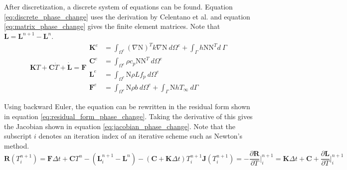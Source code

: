 After discretization, a discrete system of equations can be found. Equation \ref{eq:discrete_phase_change} uses the derivation by Celentano et al. \cite{Celentano_Oñate_Oller_1994} and equation \ref{eq:matrix_phase_change} gives the finite element matrices. Note that $\dot{\mathbf{L}} = \mathbf{L}^{n+1}-\mathbf{L}^n$.
\begin{subequations}
    \begin{equation}
        \mathbf{K}T + \mathbf{C}\dot{T} + \dot{\mathbf{L}} = \mathbf{F}
        \label{eq:discrete_phase_change}
    \end{equation}
    \begin{equation}
        \begin{split}
            \mathbf{K}^e&=\int_{\Omega^e}(\nabla \text{N})^T  k  \nabla \text{N} \ d\Omega^e + \int_{\Gamma}h\text{N}\text{N}^Td \ \Gamma \\
            \mathbf{C}^e&=\int_{\Omega^e}\rho c_p \text{N}\text{N}^T \ d\Omega^e \\
            \mathbf{L}^e&=\int_{\Omega^e} \text{N}\rho L f_p \ d\Omega^e \\
            \mathbf{F}^e&=\int_{\Omega^e} \text{N}\rho b \ d\Omega^e + \int_{\Gamma} \text{N}hT_{\infty} \ d\Gamma
        \end{split}
        \label{eq:matrix_phase_change}
    \end{equation}
\end{subequations}

Using backward Euler, the equation can be rewritten in the residual form shown in equation \ref{eq:residual_form_phase_change}. Taking the derivative of this gives the Jacobian shown in equation \ref{eq:jacobian_phase_change}. Note that the subscript $i$ denotes an iteration index of an iterative scheme such as Newton's method.
\begin{subequations}
    \begin{equation}
        \mathbf{R}(T^{n+1}_i)=\mathbf{F}\Delta t + \mathbf{C}T^n-(\mathbf{L}^{n+1}_i-\mathbf{L}^n)-(\mathbf{C}+\mathbf{K}\Delta t)T^{n+1}_i
        \label{eq:residual_form_phase_change}
    \end{equation}
    \begin{equation}
        \mathbf{J}(T^{n+1}_i)=-\frac{\partial \mathbf{R}}{\partial T}\Big|_i^{n+1}=\mathbf{K}\Delta t + \mathbf{C} + \frac{\partial \mathbf{L}}{\partial T}\Big|_i^{n+1}
        \label{eq:jacobian_phase_change}
    \end{equation}
\end{subequations}

